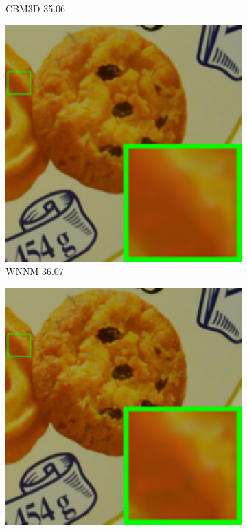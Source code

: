\begin{figure}
\begin{subfigure}[t]{0.19\textwidth}
		\caption{CBM3D 35.06}
    \end{subfigure}
    \hfill
    \begin{subfigure}[t]{0.19\textwidth}
        \centering
        \includegraphics[width=1\textwidth]{images/twsc/cc/resize_br_WNNM_d600_iso3200_2_real.png}
\caption{WNNM 36.07}
    \end{subfigure}
    \hfill
    \begin{subfigure}[t]{0.19\textwidth}
        \centering
        \includegraphics[width=1\textwidth]{images/twsc/cc/resize_br_TRD_d600_iso3200_2_real.png}

\end{subfigure}
\end{figure}
